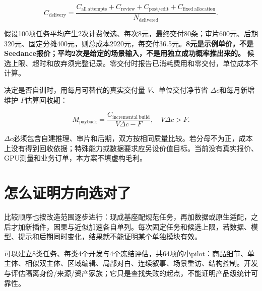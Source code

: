 \[
C_{\mathrm{delivery}}=
\frac{C_{\mathrm{all\ attempts}}+C_{\mathrm{review}}+
C_{\mathrm{post/edit}}+C_{\mathrm{fixed\ allocation}}}
{N_{\mathrm{delivered}}}.
\]

假设100项任务平均产生2次计费候选、每次8元，最终交付80条；审片600元、后期320元、固定分摊400元，则总成本2920元，每交付36.5元。\textbf{8元是示例单价，不是Seedance报价；平均2次是给定的场景输入，不是用独立成功概率推出来的。} 候选上限、超时和放弃须完整记录。零交付时报告已消耗费用和零交付，单位成本不计算。

决定是否自训时，用每月可替代的真实交付量 \(V\)、单位交付净节省 \(\Delta c\)和每月新增维护 \(F\)估算回收期：

\[
M_{\mathrm{payback}}=\frac{C_{\mathrm{incremental\ build}}}{V\Delta c-F},
\quad V\Delta c>F.
\]

\(\Delta c\)必须包含自建推理、审片和后期，双方按相同质量比较。若分母不为正，成本上没有得到回收依据；特殊能力或数据要求应另设价值目标。当前没有真实报价、GPU测量和业务订单，本方案不填虚构毛利。

\section{怎么证明方向选对了}\label{seedance-m27-ux600eux4e48ux8bc1ux660eux65b9ux5411ux9009ux5bf9ux4e86}

比较顺序也按改造范围逐步进行：现成基座配规范任务，再加数据或原生适配，之后才加新插件，因果与近似加速各自单列。每次固定任务和候选上限，若数据、模型、提示和后期同时变化，结果就不能证明某个单独模块有效。

可以建立8类任务、每类4个开发与4个冻结评估，共64项的小pilot：商品细节、单主体、相似双主体、区域编辑、局部对白、连续叙事、场景重访、结构控制。开发与评估隔离身份/来源/资产家族；它只是查找失败的起点，不能证明产品级统计可靠性。

